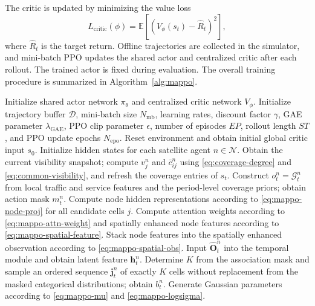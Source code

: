 \documentclass[journal]{IEEEtran}
\newcommand{\revbegin}[1]{\color{revisionblue}\ignorespaces}
\newcommand{\revend}[1]{\color{black}\ignorespaces}
\begin{document}
The critic is updated by minimizing the value loss
\begin{equation}
L_{\mathrm{critic}}(\phi)=\mathbb E\left[(V_\phi(s_t)-\hat R_t)^2\right],
\label{eq:mappo-critic-loss}
\end{equation}
\revbegin{}where $\hat R_t$ is the target return. Offline trajectories are collected in the simulator, and mini-batch PPO updates the shared actor and centralized critic after each rollout. The trained actor is fixed during evaluation. The overall training procedure is summarized in Algorithm~\ref{alg:mappo}.\revend{}

\begin{algorithm}[!b]
\revbegin{}
\caption{MAPPO-based Beam Hopping and Power Allocation Algorithm}
\label{alg:mappo}
\footnotesize
\begin{algorithmic}[1]
\STATE Initialize shared actor network $\pi_{\theta}$ and centralized critic network $V_\phi$.
\STATE Initialize trajectory buffer $\mathcal D$, mini-batch size $N_{\mathrm{mb}}$, learning rates, discount factor $\gamma$, GAE parameter $\lambda_{\mathrm{GAE}}$, PPO clip parameter $\epsilon$, number of episodes $EP$, rollout length $ST$, and PPO update epochs $N_{\mathrm{epo}}$.
\STATE Reset environment and obtain initial global critic input $s_0$.
\STATE Initialize hidden states for each satellite agent $n\in\mathcal N$.
\STATE Obtain the current visibility snapshot; compute $v_j^n$ and $\bar c_{ij}^n$ using \eqref{eq:coverage-degree} and \eqref{eq:common-visibility}, and refresh the coverage entries of $s_t$.
\ENDIF
{}
\STATE Construct $o_t^n=\mathcal G_t^n$ from local traffic and service features and the period-level coverage priors; obtain action mask $m_t^n$.
\STATE Compute node hidden representations according to \eqref{eq:mappo-node-proj} for all candidate cells $j$.
\STATE Compute attention weights according to \eqref{eq:mappo-attn-weight} and spatially enhanced node features according to \eqref{eq:mappo-spatial-feature}.
\STATE Stack node features into the spatially enhanced observation according to \eqref{eq:mappo-spatial-obs}.
\STATE Input $\hat{\mathbf O}_t^n$ into the temporal module and obtain latent feature $\mathbf h_t^n$.
\STATE Determine $K$ from the association mask and sample an ordered sequence $\mathbf j_t^n$ of exactly $K$ cells without replacement from the masked categorical distributions; obtain $b_t^n$.
\STATE Generate Gaussian parameters according to \eqref{eq:mappo-mu} and \eqref{eq:mappo-logsigma}.

\end{algorithmic}
\end{algorithm}
\end{document}
